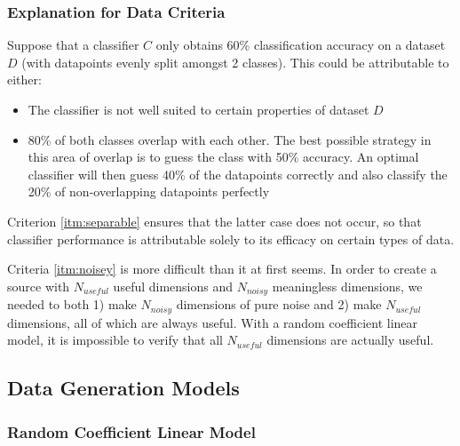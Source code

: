 \documentclass{article}
\begin{document}
\subsubsection*{Explanation for Data Criteria}

Suppose that a classifier $C$ only obtains 60\% classification accuracy on a
dataset $D$ (with datapoints evenly split amongst 2 classes). This could be
attributable to either:
\begin{itemize}
    \item The classifier is not well suited to certain properties of dataset $D$
    \item 80\% of both classes overlap with each other. The best possible
        strategy in this area of overlap is to guess the class with 50\%
        accuracy. An optimal classifier will then guess 40\% of the datapoints
        correctly and also classify the 20\% of non-overlapping datapoints
        perfectly
\end{itemize}
Criterion \ref{itm:separable} ensures that the latter case does not occur,
so that classifier performance is attributable solely to its efficacy on
certain types of data.

Criteria \ref{itm:noisey} is more difficult than it at first seems. In
order to create a source with $N_{useful}$ useful dimensions and $N_{noisy}$
meaningless dimensions, we needed to both 1) make $N_{noisy}$ dimensions of
pure noise and 2) make $N_{useful}$ dimensions, all of which are always useful.
With a random coefficient linear model, it is impossible to verify that all
$N_{useful}$ dimensions are actually useful.



\subsection*{Data Generation Models}

\subsubsection*{Random Coefficient Linear Model}
\end{document}
